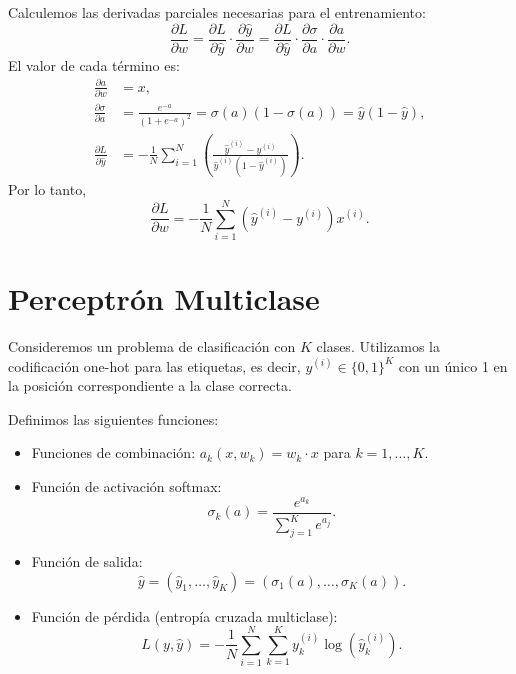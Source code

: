 \documentclass[a4,11pt]{aleph-notas}
\begin{document}
Calculemos las derivadas parciales necesarias para el entrenamiento:
\[
    \frac{\partial L}{\partial w} 
    = \frac{\partial L}{\partial \hat y} \cdot \frac{\partial \hat y}{\partial w}
    = \frac{\partial L}{\partial \hat y} \cdot \frac{\partial \sigma}{\partial a} \cdot \frac{\partial a}{\partial w}.
\]
El valor de cada término es:
\begin{align*}
    \frac{\partial a}{\partial w} &= x, \\
    \frac{\partial \sigma}{\partial a} &= \frac{e^{-a}}{(1 + e^{-a})^2} = \sigma(a)(1 - \sigma(a)) = \hat y (1 - \hat y), \\
    \frac{\partial L}{\partial \hat y} &= -\frac{1}{N} \sum_{i=1}^N \left( \frac{\hat y^{(i)} - y^{(i)}}{\hat y^{(i)} (1 - \hat y^{(i)})} \right).
\end{align*}
Por lo tanto,
\[
    \frac{\partial L}{\partial w}
    = -\frac{1}{N} \sum_{i=1}^N (\hat y^{(i)} - y^{(i)}) x^{(i)}.
\]

\section{Perceptrón Multiclase}

Consideremos un problema de clasificación con \(K\) clases. Utilizamos la codificación one-hot para las etiquetas, es decir, \(y^{(i)} \in \{0,1\}^K\) con un único 1 en la posición correspondiente a la clase correcta.

Definimos las siguientes funciones:
\begin{itemize}
    \item Funciones de combinación: \(a_k(x,w_k) = w_k\cdot x\) para \(k = 1, \ldots, K\).
    \item Función de activación softmax:
    \[
        \sigma_k(a) = \frac{e^{a_k}}{\sum_{j=1}^K e^{a_j}}.
    \]
    \item Función de salida: 
    \[
        \hat y = (\hat y_1, \ldots, \hat y_K) = (\sigma_1(a), \ldots, \sigma_K(a)).
    \]
    \item Función de pérdida (entropía cruzada multiclase):
    \[
        L(y,\hat y) = -\frac{1}{N} \sum_{i=1}^N \sum_{k=1}^K y_k^{(i)} \log(\hat y_k^{(i)}).
    \]
\end{itemize}
\end{document}
